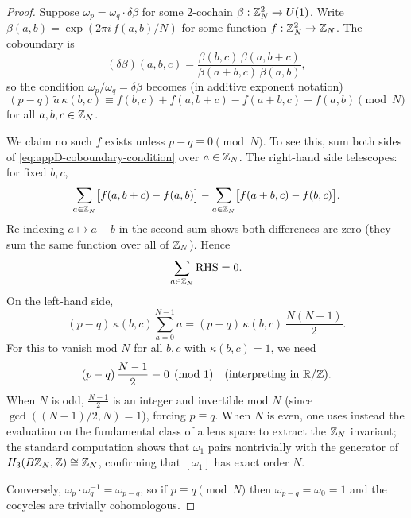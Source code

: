 \begin{proof}
Suppose $\omega_p=\omega_q\cdot\delta\beta$ for some $2$-cochain $\beta:\mathbb{Z}_N^2\to U(1)$. Write $\beta(a,b)=\exp(2\pi i\,f(a,b)/N)$ for some function $f:\mathbb{Z}_N^2\to\mathbb{Z}_N$. The coboundary is
\begin{equation}\label{eq:appD-2-coboundary}
(\delta\beta)(a,b,c)=\frac{\beta(b,c)\,\beta(a,b+c)}{\beta(a+b,c)\,\beta(a,b)},
\end{equation}
so the condition $\omega_p/\omega_q=\delta\beta$ becomes (in additive exponent notation)
\begin{equation}\label{eq:appD-coboundary-condition}
(p-q)\,\widetilde{a}\,\kappa(b,c)\equiv f(b,c)+f(a,b+c)-f(a+b,c)-f(a,b)\pmod{N}
\end{equation}
for all $a,b,c\in\mathbb{Z}_N$.

\medskip

\noindent We claim no such $f$ exists unless $p-q\equiv 0\pmod N$. To see this, sum both sides of \eqref{eq:appD-coboundary-condition} over $a\in\mathbb{Z}_N$. The right-hand side telescopes: for fixed $b,c$,
\begin{equation*}
\sum_{a\in\mathbb{Z}_N}\bigl[f(a,b+c)-f(a,b)\bigr]-\sum_{a\in\mathbb{Z}_N}\bigl[f(a+b,c)-f(b,c)\bigr].
\end{equation*}
Re-indexing $a\mapsto a-b$ in the second sum shows both differences are zero (they sum the same function over all of $\mathbb{Z}_N$). Hence
\begin{equation*}
\sum_{a\in\mathbb{Z}_N}\text{RHS}=0.
\end{equation*}
On the left-hand side,
\begin{equation*}
(p-q)\,\kappa(b,c)\sum_{a=0}^{N-1}a=(p-q)\,\kappa(b,c)\,\frac{N(N-1)}{2}.
\end{equation*}
For this to vanish mod $N$ for all $b,c$ with $\kappa(b,c)=1$, we need
\begin{equation*}
(p-q)\,\frac{N-1}{2}\equiv 0\pmod{1}\quad\text{(interpreting in }\mathbb{R}/\mathbb{Z}\text{)}.
\end{equation*}
When $N$ is odd, $\frac{N-1}{2}$ is an integer and invertible mod $N$ (since $\gcd((N-1)/2,N)=1$), forcing $p\equiv q$. When $N$ is even, one uses instead the evaluation on the fundamental class of a lens space to extract the $\mathbb{Z}_N$ invariant; the standard computation \cite{Brown1982} shows that $\omega_1$ pairs nontrivially with the generator of $H_3(B\mathbb{Z}_N,\mathbb{Z})\cong\mathbb{Z}_N$, confirming that $[\omega_1]$ has exact order $N$.

\medskip

\noindent Conversely, $\omega_p\cdot\omega_q^{-1}=\omega_{p-q}$, so if $p\equiv q\pmod N$ then $\omega_{p-q}=\omega_0=1$ and the cocycles are trivially cohomologous.
\end{proof}

